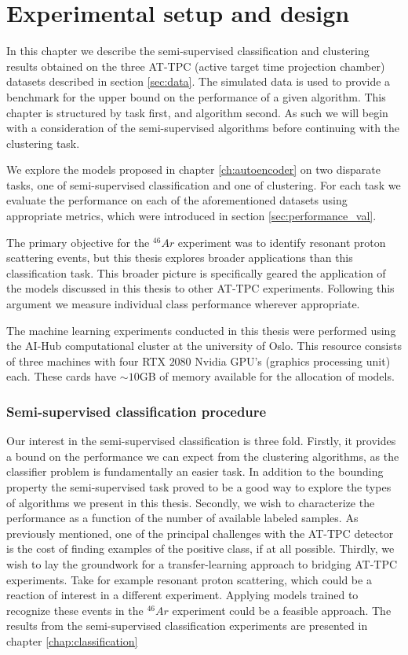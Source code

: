\chapter{Experimental setup and design}

In this chapter we describe the semi-supervised classification and clustering results obtained on the three AT-TPC (active target time projection chamber) datasets described in section \ref{sec:data}. The simulated data is used to provide a benchmark for the upper bound on the performance of a given algorithm. This chapter is structured by task first, and algorithm second. As such we will begin with a consideration of the semi-supervised algorithms before continuing with the clustering task. 

 We explore the models proposed in chapter \ref{ch:autoencoder} on two disparate tasks, one of semi-supervised classification and one of clustering. For each task  we evaluate the performance on each of the aforementioned datasets using appropriate metrics, which were introduced in section \ref{sec:performance_val}. 

 The primary objective for the ${}^{46}Ar$ experiment was to identify resonant proton scattering events, but this thesis explores broader applications than this classification task. This broader picture is specifically geared the application of the models discussed in this thesis to other AT-TPC experiments. Following this argument we measure individual class performance wherever appropriate. 

The machine learning experiments conducted in this thesis were performed using the AI-Hub computational cluster at the university of Oslo.  This resource consists of three machines with four RTX $2080$ Nvidia GPU's (graphics processing unit) each. These cards have $\sim 10$GB of memory available for the allocation of models.

\subsection{Semi-supervised classification procedure}

Our interest in the semi-supervised classification is three fold. Firstly, it provides a bound on the performance we can expect from the clustering algorithms, as the classifier problem is fundamentally an easier task. In addition to the bounding property the semi-supervised task proved to be a good way to explore the types of algorithms we present in this thesis. Secondly, we wish to characterize the performance as a function of the number of available labeled samples. As previously mentioned, one of the principal challenges with the AT-TPC detector is the cost of finding examples of the positive class, if at all possible. Thirdly, we wish to lay the groundwork for a transfer-learning approach to bridging AT-TPC experiments. Take for example resonant proton scattering, which could be a reaction of interest in a different experiment. Applying models trained to recognize these events in the ${}^{46}Ar$ experiment could be a feasible approach. The results from the semi-supervised classification experiments are presented in chapter \ref{chap:classification}

